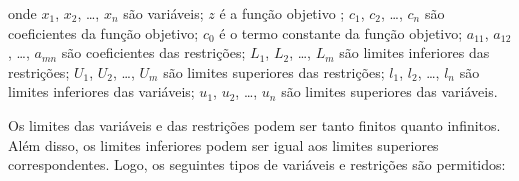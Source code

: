 \documentclass[11pt, brazil]{report}
\begin{document}

\noindent
onde $x_1$, $x_2$, \dots, $x_n$ são variáveis; $z$ é a função objetivo
; $c_1$, $c_2$, \dots, $c_n$ são coeficientes da função objetivo; $c_0$
é o termo constante da função objetivo; $a_{11}$,
$a_{12}$, \dots, $a_{mn}$ são coeficientes das restrições; $L_1$, $L_2$,
\dots, $L_m$ são limites inferiores das restrições; $U_1$, $U_2$, \dots, $U_m$
são limites superiores das restrições; $l_1$, $l_2$, \dots, $l_n$ são limites
inferiores das variáveis; $u_1$, $u_2$, \dots, $u_n$ são limites superiores das
variáveis.

Os limites das variáveis e das restrições podem ser tanto finitos quanto
infinitos. Além disso, os limites inferiores podem ser igual aos limites
superiores correspondentes. Logo, os seguintes tipos de variáveis e
restrições são permitidos:


%

\medskip
\end{document}
